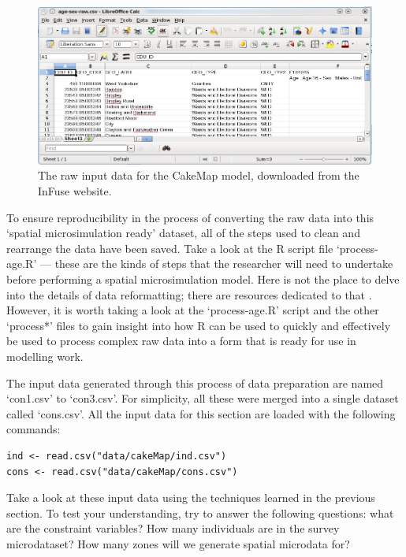 \documentclass[a4paper, 11pt, twoside]{article}
\begin{document}
\begin{figure}
 \includegraphics[width=12cm]{raw-data-screenshot}
\caption{The raw input data for the CakeMap model, downloaded from the InFuse website.}
\label{fraw}
\end{figure}


To ensure reproducibility in the process of converting the raw data into
this `spatial microsimulation ready' dataset, all of the steps used to
clean and rearrange the data have been saved. Take a look at the R script file
`process-age.R' --- these are the kinds of steps that the researcher will need to
undertake before performing a spatial microsimulation model. 
Here is not the place to delve into the details of data reformatting;
there are resources dedicated to that \citep{tidy-data, kabacoff2011r}.
However, it is worth taking a look at the `process-age.R' script and the
other `process*' files to gain insight into how R can be used to quickly
and effectively be used to process complex raw data into a form that is
ready for use in modelling work.

The input data generated through this process of data preparation are named
`con1.csv' to `con3.csv'. For simplicity, all these were merged into a single
dataset called `cons.csv'. All the input data for this section
are loaded with the following commands:


\begin{lstlisting}[float=h, caption={Loading the input data for CakeMap (see `cMap.R')}]
ind <- read.csv("data/cakeMap/ind.csv")
cons <- read.csv("data/cakeMap/cons.csv")
\end{lstlisting}

Take a look at these input data using the techniques learned in the previous
section. To test your understanding, try to answer the following questions:
what are the constraint variables? How many individuals are in the survey microdataset?
How many zones will we generate spatial microdata for?
\end{document}
